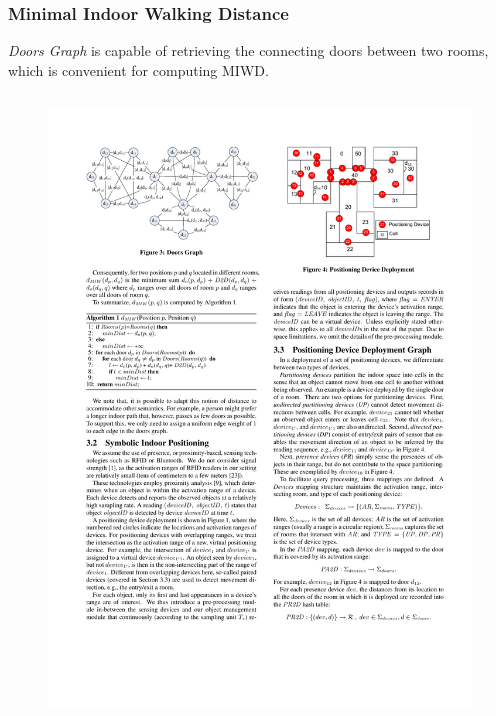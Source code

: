 
\begin{frame}
\frametitle{Minimal Indoor Walking Distance}

\emph{Doors Graph} is capable of retrieving the connecting doors between two rooms, which is convenient for computing MIWD.

\begin{columns}[c]

    \begin{figure}[tb]
      \includegraphics[width=\columnwidth]{figures/2-3/2-3-2.pdf}
    \end{figure}


\end{columns}
\end{frame}
